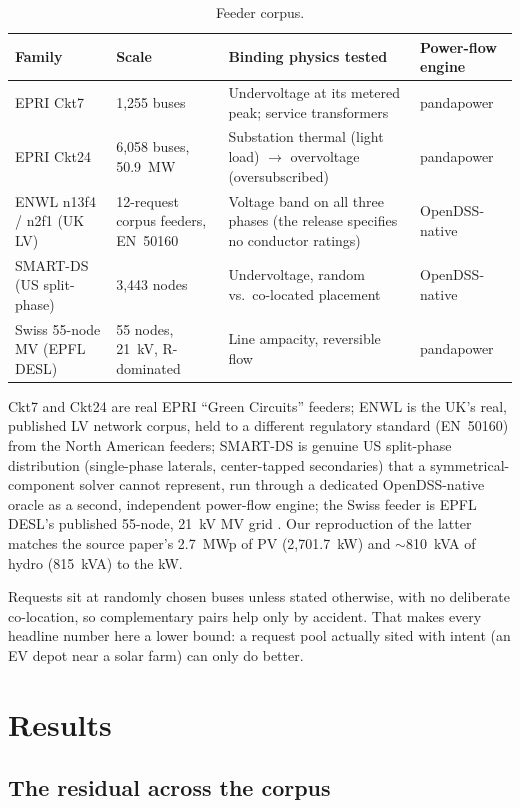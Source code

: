 \documentclass[review,authoryear,12pt]{elsarticle}
\begin{document}
\begin{table}[htbp]
\centering
\caption{Feeder corpus.}
\label{tab:corpus}
\small
\begin{tabular}{@{}p{2.6cm}p{2.6cm}p{4.0cm}p{2.2cm}@{}}
\toprule
Family & Scale & Binding physics tested & Power-flow engine \\
\midrule
EPRI Ckt7 & 1{,}255 buses & Undervoltage at its metered peak; service transformers & pandapower \\
EPRI Ckt24 & 6{,}058 buses, 50.9~MW & Substation thermal (light load) $\to$ overvoltage (oversubscribed) & pandapower \\
ENWL n13f4 / n2f1 (UK LV) & 12-request corpus feeders, EN~50160 & Voltage band on all three phases (the release specifies no conductor ratings) & OpenDSS-native \\
SMART-DS (US split-phase) & 3{,}443 nodes & Undervoltage, random vs.\ co-located placement & OpenDSS-native \\
Swiss 55-node MV (EPFL DESL) & 55 nodes, 21~kV, R-dominated & Line ampacity, reversible flow & pandapower \\
\bottomrule
\end{tabular}
\end{table}

Ckt7 and Ckt24 are real EPRI ``Green Circuits'' feeders; ENWL is the UK's
real, published LV network corpus, held to a different regulatory standard
(EN~50160) from the North American feeders; SMART-DS is genuine US
split-phase distribution (single-phase laterals, center-tapped secondaries)
that a symmetrical-component solver cannot represent, run through a
dedicated OpenDSS-native oracle as a second, independent power-flow engine;
the Swiss feeder is EPFL DESL's published 55-node, 21~kV MV grid
\citep{yi2022}. Our reproduction of the latter matches the source paper's
2.7~MWp of PV (2{,}701.7~kW) and $\sim$810~kVA of hydro (815~kVA) to the kW.

Requests sit at randomly chosen buses unless stated otherwise, with no
deliberate co-location, so complementary pairs help only by accident. That
makes every headline number here a lower bound: a request pool actually
sited with intent (an EV depot near a solar farm) can only do better.

\section{Results}
\label{sec:results}

\subsection{The residual across the corpus}
\label{sec:corpus-results}
\end{document}
